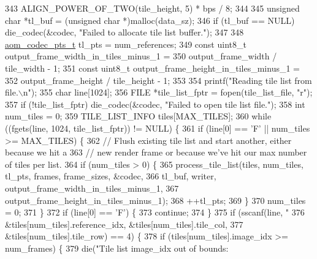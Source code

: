 \begin{DoxyCodeInclude}
{{{{{{343                          ALIGN\_POWER\_OF\_TWO(tile\_height, 5) * bps / 8;
344 
345   \textcolor{keywordtype}{unsigned} \textcolor{keywordtype}{char} *tl\_buf = (\textcolor{keywordtype}{unsigned} \textcolor{keywordtype}{char} *)malloc(data\_sz);
346   \textcolor{keywordflow}{if} (tl\_buf == NULL) die\_codec(&codec, \textcolor{stringliteral}{"Failed to allocate tile list buffer."});
347 
348   \hyperlink{group__encoder_ga958524226c9a65251c9e4f7bb78fc606}{aom\_codec\_pts\_t} tl\_pts = num\_references;
349   \textcolor{keyword}{const} uint8\_t output\_frame\_width\_in\_tiles\_minus\_1 =
350       output\_frame\_width / tile\_width - 1;
351   \textcolor{keyword}{const} uint8\_t output\_frame\_height\_in\_tiles\_minus\_1 =
352       output\_frame\_height / tile\_height - 1;
353 
354   printf(\textcolor{stringliteral}{"Reading tile list from file.\(\backslash\)n"});
355   \textcolor{keywordtype}{char} line[1024];
356   FILE *tile\_list\_fptr = fopen(tile\_list\_file, \textcolor{stringliteral}{"r"});
357   \textcolor{keywordflow}{if} (!tile\_list\_fptr) die\_codec(&codec, \textcolor{stringliteral}{"Failed to open tile list file."});
358   \textcolor{keywordtype}{int} num\_tiles = 0;
359   TILE\_LIST\_INFO tiles[MAX\_TILES];
360   \textcolor{keywordflow}{while} ((fgets(line, 1024, tile\_list\_fptr)) != NULL) \{
361     \textcolor{keywordflow}{if} (line[0] == \textcolor{charliteral}{'F'} || num\_tiles >= MAX\_TILES) \{
362       \textcolor{comment}{// Flush existing tile list and start another, either because we hit a}
363       \textcolor{comment}{// new render frame or because we've hit our max number of tiles per list.}
364       \textcolor{keywordflow}{if} (num\_tiles > 0) \{
365         process\_tile\_list(tiles, num\_tiles, tl\_pts, frames, frame\_sizes, &codec,
366                           tl\_buf, writer, output\_frame\_width\_in\_tiles\_minus\_1,
367                           output\_frame\_height\_in\_tiles\_minus\_1);
368         ++tl\_pts;
369       \}
370       num\_tiles = 0;
371     \}
372     \textcolor{keywordflow}{if} (line[0] == \textcolor{charliteral}{'F'}) \{
373       \textcolor{keywordflow}{continue};
374     \}
375     \textcolor{keywordflow}{if} (sscanf(line, \textcolor{stringliteral}{"%
376                &tiles[num\_tiles].reference\_idx, &tiles[num\_tiles].tile\_col,
377                &tiles[num\_tiles].tile\_row) == 4) \{
378       \textcolor{keywordflow}{if} (tiles[num\_tiles].image\_idx >= num\_frames) \{
379         die(\textcolor{stringliteral}{"Tile list image\_idx out of bounds: %
}}}}}}}}
\end{DoxyCodeInclude}
